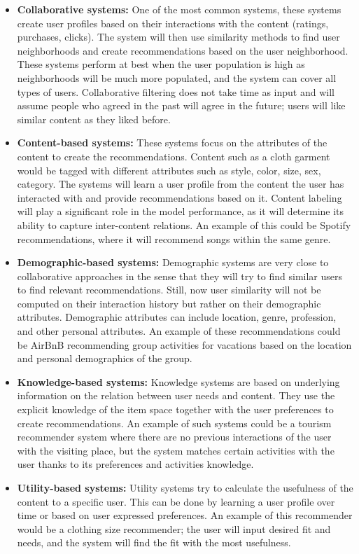 \documentclass{tex_files/kththesis}
\begin{document}
\begin{itemize}
    \item \textbf{Collaborative systems:} One of the most common systems, these systems create user profiles based on their interactions with the content (ratings, purchases, clicks). The system will then use similarity methods to find user neighborhoods and create recommendations based on the user neighborhood. These systems perform at best when the user population is high as neighborhoods will be much more populated, and the system can cover all types of users. Collaborative filtering does not take time as input and will assume people who agreed in the past will agree in the future; users will like similar content as they liked before.
    
    \item \textbf{Content-based systems:}  These systems focus on the attributes of the content to create the recommendations. Content such as a cloth garment would be tagged with different attributes such as style, color, size, sex, category. The systems will learn a user profile from the content the user has interacted with and provide recommendations based on it. Content labeling will play a significant role in the model performance, as it will determine its ability to capture inter-content relations. An example of this could be Spotify recommendations, where it will recommend songs within the same genre. 
    
    \item \textbf{Demographic-based systems:} Demographic systems are very close to collaborative approaches in the sense that they will try to find similar users to find relevant recommendations. Still, now user similarity will not be computed on their interaction history but rather on their demographic attributes. Demographic attributes can include location, genre, profession, and other personal attributes. An example of these recommendations could be AirBnB recommending group activities for vacations based on the location and personal demographics of the group.
    
    \item \textbf{Knowledge-based systems:} Knowledge systems are based on underlying information on the relation between user needs and content. They use the explicit knowledge of the item space together with the user preferences to create recommendations. An example of such systems could be a tourism recommender system where there are no previous interactions of the user with the visiting place, but the system matches certain activities with the user thanks to its preferences and activities knowledge.
    
    \item \textbf{Utility-based systems:} Utility systems try to calculate the usefulness of the content to a specific user. This can be done by learning a user profile over time or based on user expressed preferences. An example of this recommender would be a clothing size recommender; the user will input desired fit and needs, and the system will find the fit with the most usefulness.
    
\end{itemize}
\end{document}
